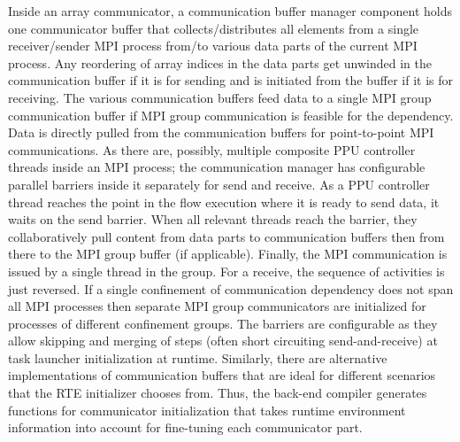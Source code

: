 \documentclass[ASNA,twocolumn]{USG} %
\begin{document}
{Inside an array communicator, a communication buffer manager component holds one communicator buffer that collects/distributes all elements from a single receiver/sender MPI process from/to various data parts of the current MPI process. Any reordering of array indices in the data parts get unwinded in the communication buffer if it is for sending and is initiated from the buffer if it is for receiving. The various communication buffers feed data to a single MPI group communication buffer if MPI group communication is feasible for the dependency. Data is directly pulled from the communication buffers for point-to-point MPI communications. As there are, possibly, multiple composite PPU controller threads inside an MPI process; the communication manager has configurable parallel barriers inside it separately for send and receive. As a PPU controller thread reaches the point in the flow execution where it is ready to send data, it waits on the send barrier. When all relevant threads reach the barrier, they collaboratively pull content from data parts to communication buffers then from there to the MPI group buffer (if applicable). Finally, the MPI communication is issued by a single thread in the group. For a receive, the sequence of activities is just reversed. If a single confinement of communication dependency does not span all MPI processes then separate MPI group communicators are initialized for processes of different confinement groups. The barriers are configurable as they allow skipping and merging of steps (often short circuiting send-and-receive) at task launcher initialization at runtime. Similarly, there are alternative implementations of communication buffers that are ideal for different scenarios that the RTE initializer chooses from. Thus, the back-end compiler generates functions for communicator initialization that takes runtime environment information into account for fine-tuning each communicator part.

}
\end{document}
